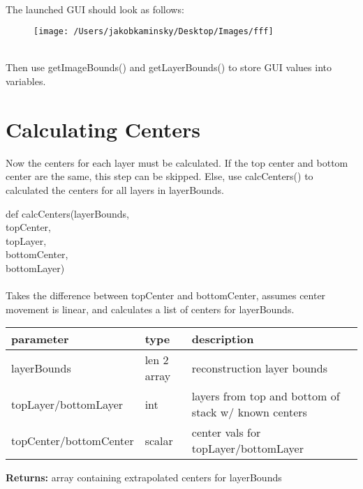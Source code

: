 \documentclass[10pt]{article}
\begin{document}
\ \\ The launched GUI should look as follows:
\begin{figure}[H]
    \begin{center}
        \texttt{[image: /Users/jakobkaminsky/Desktop/Images/fff]}
    \end{center}
\end{figure}
\ \\Then use getImageBounds() and getLayerBounds() to store GUI values into variables.
\section{Calculating Centers}
Now the centers for each layer must be calculated. If the top center and bottom center are the same, this step can be skipped. 
Else, use calcCenters() to calculated the centers for all layers in layerBounds.
\begin{center} 
def calcCenters(layerBounds,\\ topCenter,\\ topLayer,\\ bottomCenter,\\ bottomLayer)\\
\ \\ Takes the difference between topCenter and bottomCenter, assumes
center movement is linear, and calculates a list of centers for
layerBounds.
\begin{table}[H]
    \centering
    \begin{tabular}{|l|l|l|}
        \hline
        \textbf{parameter} & \textbf{type} &\textbf{description}  \\ \hline
        layerBounds&len 2 array&reconstruction layer bounds\\ \hline
        topLayer/bottomLayer&int&layers from top and bottom of stack w/ known centers\\ \hline
        topCenter/bottomCenter&scalar&center vals for topLayer/bottomLayer\\ \hline
    \end{tabular}
\end{table}
\textbf{Returns:} array containing extrapolated centers for layerBounds\\
\end{center}
\end{document}
